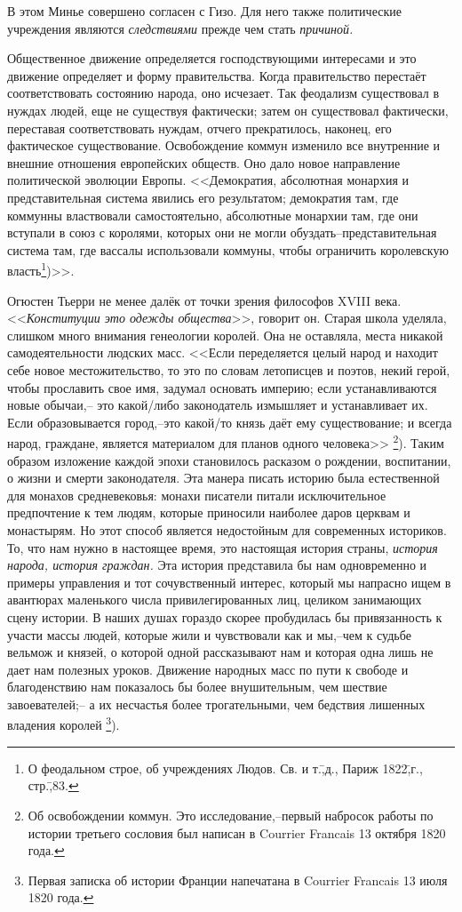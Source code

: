 В этом Минье совершено согласен с Гизо. Для него также политические учреждения являются \emph{следствиями} прежде чем стать \emph{причиной.}

Общественное движение определяется господствующими интересами и это движение определяет и форму правительства. Когда правительство перестаёт соответствовать состоянию народа, оно исчезает. Так феодализм существовал в нуждах людей, еще не существуя фактически; затем он существовал фактически, переставая соответствовать нуждам, отчего прекратилось, наконец, его фактическое существование. Освобождение коммун изменило все внутренние и внешние отношения европейских обществ. Оно дало новое направление политической эволюции Европы. <<Демократия, абсолютная монархия и представительная система явились его результатом; демократия там, где коммунны властвовали самостоятельно, абсолютные монархии там, где они вступали в союз с королями, которых они не могли обуздать\---представительная система там, где вассалы использовали коммуны, чтобы ограничить королевскую власть\footnote{О феодальном строе, об учреждениях Людов. Св. и т.\=,д., Париж 1822\=,г., стр.\=,83.})>>.

Огюстен Тьерри не менее далёк от точки зрения философов XVIII века. <<\emph{Конституции это одежды общества}>>, говорит он. Старая школа уделяла, слишком много внимания генеологии королей. Она не оставляла, места никакой самодеятельности людских масс. <<Если переделяется целый народ и находит себе новое местожительство, то это по словам летописцев и поэтов, некий герой, чтобы прославить свое имя, задумал основать империю; если устанавливаются новые обычаи,\--- это какой\-/либо законодатель измышляет и устанавливает их. Если образовывается город,\---это какой\-/то князь даёт ему существование; и всегда народ, граждане, является материалом для планов одного человека>> \footnote{Об освобождении коммун. Это исследование,\---первый набросок работы по истории третьего сословия был написан в Courrier Francais 13 октября 1820 года.}). Таким образом изложение каждой эпохи становилось расказом о рождении, воспитании, о жизни и смерти законодателя. Эта манера писать историю была естественной для монахов средневековья: монахи писатели питали исключительное предпочтение к тем людям, которые приносили наиболее даров церквам и монастырям. Но этот способ является недостойным для современных историков. То, что нам нужно в настоящее время, это настоящая история страны, \emph{история народа, история граждан.} Эта история представила бы нам одновременно и примеры управления и тот сочувственный интерес, который мы напрасно ищем в авантюрах маленького числа привилегированных лиц, целиком занимающих сцену истории. В наших душах гораздо скорее пробудилась бы привязанность к участи массы людей, которые жили и чувствовали как и мы,\---чем к судьбе вельмож и князей, о которой одной рассказывают нам и которая одна лишь не дает нам полезных уроков. Движение народных масс по пути к свободе и благоденствию нам показалось бы более внушительным, чем шествие завоевателей;\--- а их несчастья более трогательными, чем бедствия лишенных владения королей \footnote{Первая записка об истории Франции напечатана в Courrier Francais 13 июля 1820 года.}).

